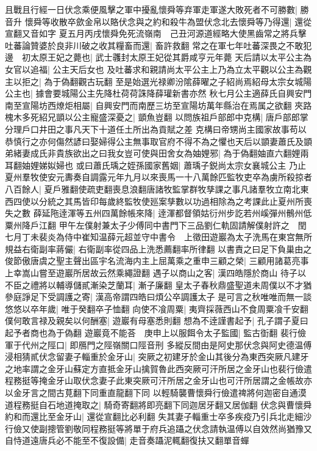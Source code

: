且戰且行經一日伏念乘便風擊之軍中擾亂懷舜等弃軍走軍遂大敗死者不可勝數|{
	勝音升}
懷舜等收散卒歛金帛以賂伏念與之約和殺牛為盟伏念北去懷舜等乃得還|{
	還從宣翻又音如字}
夏五月丙戌懷舜免死流嶺南　己丑河源道經略大使黑齒常之將兵擊吐蕃論贊婆於良非川破之收其糧畜而還|{
	畜許救翻}
常之在軍七年吐蕃深畏之不敢犯邊　初太原王妃之薨也|{
	武士彠封太原王妃從其爵咸亨元年薨}
天后請以太平公主為女官以追福|{
	公主天后女也}
及吐蕃求和親請尚太平公主上乃為立太平觀以公主為觀主以拒之|{
	為于偽翻觀古玩翻}
至是始選光禄卿汾隂薛曜之子紹尚焉紹母太宗女城陽公主也|{
	據會要城陽公主先降杜荷荷誅降薛瓘新書亦然}
秋七月公主適薛氏自興安門南至宣陽坊西燎炬相屬|{
	自興安門而南歷三坊至宣陽坊萬年縣治在焉属之欲翻}
夾路槐木多死紹兄顗以公主寵盛深憂之|{
	顗魚豈翻}
以問族祖戶部郎中克構|{
	唐戶部郎掌分理戶口井田之事凡天下十道任土所出為貢賦之差}
克構曰帝甥尚主國家故事苟以恭慎行之亦何傷然諺曰娶婦得公主無事取官府不得不為之懼也天后以顗妻蕭氏及顗弟緒妻成氏非貴族欲出之曰我女豈可使與田舍女為妯娌邪|{
	為于偽翻妯直六翻娌兩耳翻妯娌娣姒婦也}
或曰蕭氏瑀之姪孫國家舊姻|{
	蕭瑀子鋭尚太宗女襄城公主}
乃止　夏州羣牧使安元夀奏自調露元年九月以來喪馬一十八萬餘匹監牧吏卒為虜所殺掠者八百餘人|{
	夏戶雅翻使疏吏翻喪息浪翻唐諸牧監掌群牧孳課之事凡諸羣牧立南北東西四使以分統之其馬皆印每歲終監牧使廵案孳數以功過相除為之考課此止夏州所喪失之數}
薛延陁逹渾等五州四萬餘帳來降|{
	逹渾都督領姑衍州步訖若州嵠彈州鶻州低粟州降戶江翻}
甲午左僕射兼太子少傅同中書門下三品劉仁軌固請解僕射許之　閏七月丁未裴炎為侍中崔知温薛元超並守中書令　上徵田遊巖為太子洗馬在東宫無所規益右衛副率蔣儼|{
	右衛副率從四品上洗悉薦翻率所律翻}
以書責之曰足下負巢由之俊節傲唐虞之聖主聲出區宇名流海内主上屈萬乘之重申三顧之榮|{
	三顧用諸葛亮事上幸嵩山嘗至遊巖所居故云然乘繩證翻}
遇子以商山之客|{
	漢四皓隱於商山}
待子以不臣之禮將以輔導儲貳漸染芝蘭耳|{
	漸子廉翻}
皇太子春秋鼎盛聖道未周僕以不才猶參庭諍足下受調護之寄|{
	漢高帝謂四皓曰煩公卒調護太子}
是可言之秋唯唯而無一談悠悠以卒年歲|{
	唯于癸翻卒子恤翻}
向使不飡周粟|{
	夷齊採薇西山不食周粟飡千安翻}
僕何敢言禄及親矣以何酬塞|{
	遊巖有母塞悉則翻}
想為不逹謹書起予|{
	孔子謂子夏曰起予者商也為于偽翻}
遊巖竟不能荅　庚申上以服餌令太子監國|{
	監古衘翻}
裴行儉軍于代州之陘口|{
	即鴈門之陘嶺關口陘音刑}
多縱反間由是阿史那伏念與阿史德温傅浸相猜貳伏念留妻子輜重於金牙山|{
	突厥之初建牙於金山其後分為東西突厥凡建牙之地率謂之金牙山蘇定方直抵金牙山擒賀魯此西突厥可汗所居之金牙山也裴行儉遣程務挺等掩金牙山取伏念妻子此東突厥可汗所居之金牙山也可汗所居謂之金帳故亦以金牙言之間古莧翻下同重直龍翻下同}
以輕騎襲曹懷舜行儉遣禆將何迦密自通漠道程務挺自石地道掩取之|{
	騎奇寄翻將即亮翻下同迦居牙翻又居伽翻}
伏念與曹懷舜約和而還比至金牙山|{
	還從宣翻比必利翻}
失其妻子輜重士卒多疾疫乃引兵北走細沙行儉又使副摠管劉敬同程務挺等將單于府兵追躡之伏念請執温傅以自效然尚猶豫又自恃道遠唐兵必不能至不復設備|{
	走音奏躡泥輒翻復扶又翻單音蟬}
